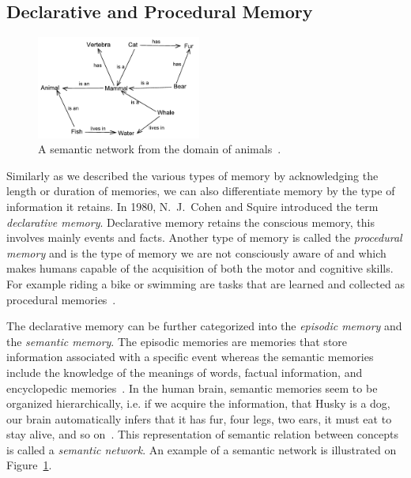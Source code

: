 \subsection{Declarative and Procedural Memory}

\begin{figure}
  \centering
  \includegraphics[width=0.48\textwidth]{img/semantic-network}
  \caption{A semantic network from the domain of animals~\cite{semanticnetworkpict}.}
  \label{fig:semantic-network}
\end{figure}

Similarly as we described the various types of memory by acknowledging the length or duration of memories, we can also differentiate memory by the type of information it retains. In 1980, N.~J.~Cohen and Squire introduced the term \textit{declarative memory}. Declarative memory retains the conscious memory, this involves mainly events and facts. Another type of memory is called the \textit{procedural memory} and is the type of memory we are not consciously aware of and which makes humans capable of the acquisition of both the motor and cognitive skills. For example riding a bike or swimming are tasks that are learned and collected as procedural memories~\cite{MichaelW.Eysenck2008}.

The declarative memory can be further categorized into the \textit{episodic memory} and the \textit{semantic memory}. The episodic memories are memories that store information associated with a specific event whereas the semantic memories include the knowledge of the meanings of words, factual information, and encyclopedic memories~\cite{cohen1980preserved}. In the human brain, semantic memories seem to be organized hierarchically, i.e. if we acquire the information, that Husky is a dog, our brain automatically infers that it has fur, four legs, two ears, it must eat to stay alive, and so on~\cite{mcclelland1995there}. This representation of semantic relation between concepts is called a \textit{semantic network}. An example of a semantic network is illustrated on Figure~\ref{fig:semantic-network}.

